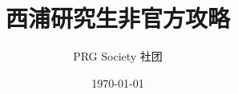 \documentclass[lang=cn,12pt,newtx]{elegantbook}
\title{西浦研究生非官方攻略}
\author{PRG Society 社团}
\date{\today}
\begin{document}
\maketitle
\frontmatter



\tableofcontents
\mainmatter








\backmatter	
\makeatletter
\makeatother
\end{document}
